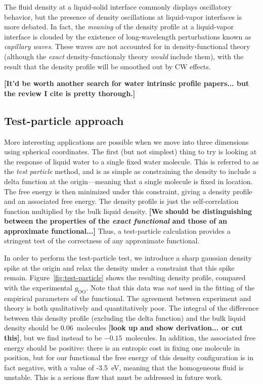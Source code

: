 \documentclass[letterpaper,twocolumn,amsmath,amssymb,prb]{revtex4-1}
\newcommand{\red}[1]{{\bf \color{red} #1}}
\newcommand{\fixme}[1]{\red{[#1]}}
\begin{document}
The fluid density at a liquid-solid interface commonly displays
oscillatory behavior, but the presence of density oscillations at
liquid-vapor interfaces is more debated\cite{penfold2001structure}.
In fact, the \emph{meaning} of the density profile at a liquid-vapor
interface is clouded by the existence of long-wavelength perturbations
known as \emph{capillary waves}.  These waves are not accounted for in
density-functional theory (although the \emph{exact}
density-functionaly theory \emph{would} include them), with the result
that the density profile will be smoothed out by CW effects.

\fixme{It'd be worth another search for water intrinsic profile
  papers... but the review I cite is pretty thorough.}

\subsection{Test-particle approach}

More interesting applications are possible when we move into three
dimensions using spherical coordinates.  The first (but not simplest)
thing to try is looking at the response of liquid water to a single
fixed water molecule.  This is referred to as the \emph{test particle}
method\cite{FIXME}, and is as simple as constraining the density to
include a delta function at the origin---meaning that a single
molecule is fixed in location.  The free energy is then minimized
under this constraint, giving a density profile and an associated free
energy.  The density profile is just the self-correlation function
multiplied by the bulk liquid density.  \fixme{We should be
  distinguishing between the properties of the \emph{exact functional}
  and those of an approximate functional...}  Thus, a test-particle
calculation provides a stringent test of the correctness of any
approximate functional.

In order to perform the test-particle test, we introduce a sharp
gaussian density spike at the origin and relax the density under a
constraint that this spike remain.  Figure~\ref{fig:test-particle}
shows the resulting density profile, compared with the experimental
$g_{\textrm{OO}}$.  Note that this data was \emph{not} used in the
fitting of the empirical parameters of the functional.  The agreement
between experiment and theory is both qualitatively and quantitatively
poor.  The integral of the difference between this density profile
(excluding the delta function) and the bulk liquid density should be
0.06~molecules \fixme{look up and show derivation... or cut this},
but we find instead to be $-0.15$~molecules.  In addition, the associated
free energy should be positive: there is an entropic cost in fixing
one molecule in position, but for our functional the free energy of
this density configuration is in fact negative, with a value of
-3.5~eV, meaning that the homogeneous fluid is unstable.  This is a
serious flaw that must be addressed in future work.
\end{document}
